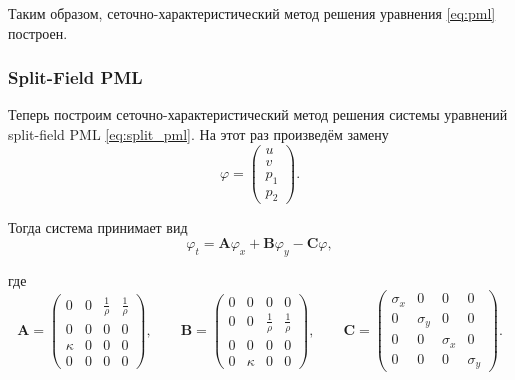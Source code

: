 Таким образом, сеточно-характеристический метод решения уравнения \eqref{eq:pml} построен.

\subsubsection{Split-Field PML}

Теперь построим сеточно-характеристический метод решения системы уравнений split-field PML \eqref{eq:split_pml}. На этот раз произведём замену
\begin{equation*}
	\varphi = \begin{pmatrix} u \\ v \\ p_1 \\ p_2 \end{pmatrix} .
\end{equation*}

\noindent Тогда система принимает вид
\begin{equation*}
	\varphi_t = \pmb{A} \varphi_x +  \pmb{B} \varphi_y - \pmb{C} \varphi ,
\end{equation*}

где 
\begin{equation*}
	\pmb{A} = 
	\begin{pmatrix}
    	0 & 0 & \frac{1}{\rho} & \frac{1}{\rho} \\
    	0 & 0 & 0 & 0 \\
        \kappa & 0 & 0 & 0 \\
    	0 & 0 & 0 & 0
	\end{pmatrix} ,\qquad
	\pmb{B} = 
	\begin{pmatrix}
    	0 & 0 & 0 & 0 \\
        0 & 0 & \frac{1}{\rho} & \frac{1}{\rho} \\
    	0 & 0 & 0 & 0 \\
        0 & \kappa  & 0 & 0
	\end{pmatrix} ,\qquad
	\pmb{C} = 
	\begin{pmatrix}
    	\sigma_x & 0 & 0 & 0 \\
    	0 & \sigma_y & 0 & 0 \\
        0 & 0 & \sigma_x & 0 \\
    	0 & 0 & 0 & \sigma_y
	\end{pmatrix} .
\end{equation*}

